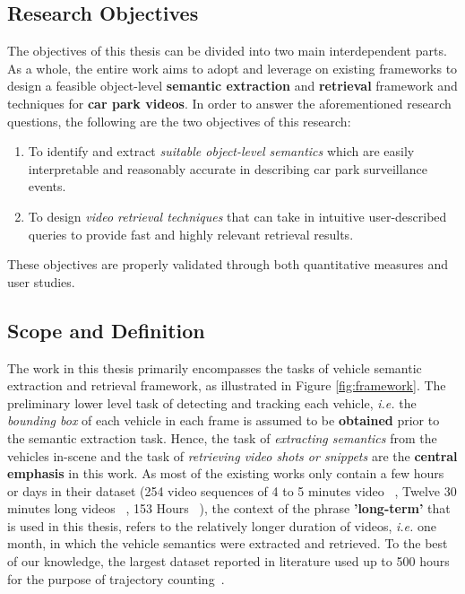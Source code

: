 \subsection{Research Objectives}
The objectives of this thesis can be divided into two main interdependent parts. As a whole, the entire work aims to adopt and leverage on existing frameworks to design a feasible object-level \textbf{semantic extraction} and \textbf{retrieval} framework and techniques for \textbf{car park videos}. In order to answer the aforementioned research questions, the following are the two objectives of this research:

\begin{enumerate}
  \item To identify and extract \textit{suitable object-level semantics} which are easily interpretable and reasonably accurate in describing car park surveillance events.
  \item To design \textit{video retrieval techniques} that can take in intuitive user-described queries to provide fast and highly relevant retrieval results.
\end{enumerate}

These objectives are properly validated through both quantitative measures and user studies.  

\subsection{Scope and Definition}
\label{subsec:scope}
The work in this thesis primarily encompasses the tasks 
of vehicle semantic extraction and retrieval framework, as illustrated in Figure \ref{fig:framework}. The preliminary lower level task of detecting and tracking each vehicle, \emph{i.e.} the \textit{bounding box} of each vehicle in each frame is assumed to be \textbf{obtained} prior to the semantic extraction task.
Hence, the task of \textit{extracting semantics} from the vehicles in-scene and the task of \textit{retrieving video shots or snippets} are the \textbf{central emphasis} in this work.
As most of the existing works only contain a few hours or days in their dataset (254 video sequences of 4 to 5 minutes video ~\cite{liu2016highway}, Twelve 30 minutes long videos ~\cite{marmol2016quickspot}, 153 Hours ~\cite{ren2018learning}), the context of the phrase \textbf{'long-term'} that is used in this thesis, refers to the relatively longer duration of videos, \emph{i.e.} one month, in which the vehicle semantics were extracted and retrieved. To the best of our knowledge, the largest dataset reported in literature used up to 500 hours for the purpose of trajectory counting~\cite{lessard2016countingapp}.


